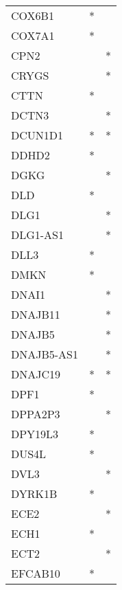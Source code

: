 \begin{longtable}{lcc}
COX6B1           &              * &            \\
COX7A1           &              * &            \\
CPN2             &                &          * \\
CRYGS            &                &          * \\
CTTN             &              * &            \\
DCTN3            &                &          * \\
DCUN1D1          &              * &          * \\
DDHD2            &              * &            \\
DGKG             &                &          * \\
DLD              &              * &            \\
DLG1             &                &          * \\
DLG1-AS1         &                &          * \\
DLL3             &              * &            \\
DMKN             &              * &            \\
DNAI1            &                &          * \\
DNAJB11          &                &          * \\
DNAJB5           &                &          * \\
DNAJB5-AS1       &                &          * \\
DNAJC19          &              * &          * \\
DPF1             &              * &            \\
DPPA2P3          &                &          * \\
DPY19L3          &              * &            \\
DUS4L            &              * &            \\
DVL3             &                &          * \\
DYRK1B           &              * &            \\
ECE2             &                &          * \\
ECH1             &              * &            \\
ECT2             &                &          * \\
EFCAB10          &              * &            \\

\end{longtable}

